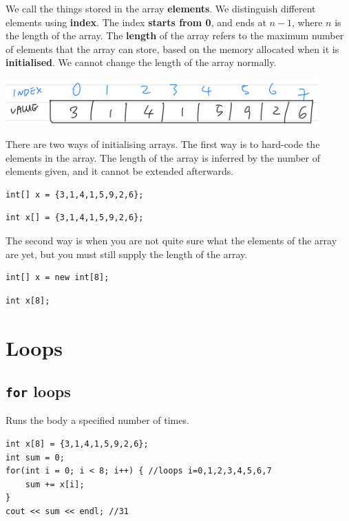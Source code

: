 We call the things stored in the array \textbf{elements}. We distinguish different elements using \textbf{index}. The index \textbf{starts from 0}, and ends at $n-1$, where $n$ is the length of the array. The \textbf{length} of the array refers to the maximum number of elements that the array can store, based on the memory allocated when it is \textbf{initialised}. We cannot change the length of the array normally.

\includegraphics[width=12cm]{images/ch2-arrayindex.png}
\vspace{6mm}

There are two ways of initialising arrays. The first way is to hard-code the elements in the array. The length of the array is inferred by the number of elements given, and it cannot be extended afterwards.

\if{}
\begin{lstlisting}
int[] x = {3,1,4,1,5,9,2,6};
\end{lstlisting}
\else
\begin{lstlisting}
int x[] = {3,1,4,1,5,9,2,6};
\end{lstlisting}
\fi

The second way is when you are not quite sure what the elements of the array are yet, but you must still supply the length of the array.

\if{}
\begin{lstlisting}
int[] x = new int[8];
\end{lstlisting}
\else
\begin{lstlisting}
int x[8];
\end{lstlisting}
\fi


\section{Loops}
\subsection{\texttt{for} loops}
Runs the body a specified number of times.

\begin{lstlisting}
int x[8] = {3,1,4,1,5,9,2,6};
int sum = 0;
for(int i = 0; i < 8; i++) { //loops i=0,1,2,3,4,5,6,7
    sum += x[i];
}
cout << sum << endl; //31
\end{lstlisting}

